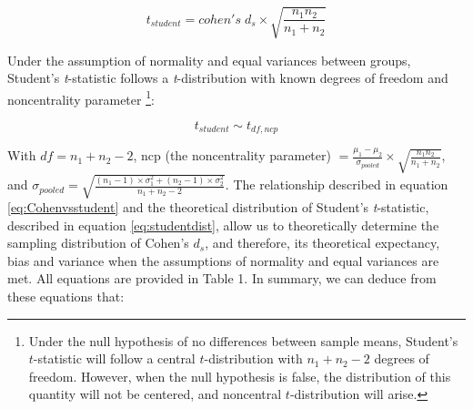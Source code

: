 \documentclass[
  man,floatsintext]{apa6}
\begin{document}
\begin{equation} 
t_{student} = cohen's \; d_s \times \sqrt{\frac{n_1n_2}{n_1+n_2}}
\label{eq:Cohenvsstudent}
\end{equation}

Under the assumption of normality and equal variances between groups, Student's \emph{t}-statistic follows a \emph{t}-distribution with known degrees of freedom and noncentrality parameter \footnote{Under the null hypothesis of no differences between sample means, Student's $t$-statistic will follow a central $t$-distribution with $n_1+n_2-2$ degrees of freedom. However, when the null hypothesis is false, the distribution of this quantity will not be centered, and noncentral $t$-distribution will arise.}:

\begin{equation} 
t_{student} \sim t_{df,ncp}
\label{eq:studentdist}
\end{equation}

With \(df=n_1+n_2-2\), ncp (the noncentrality parameter) \(= \frac{\mu_1-\mu_2}{\sigma_{pooled}} \times \sqrt{\frac{n_1n_2}{n_1+n_2}}\), and \(\sigma_{pooled}= \sqrt{\frac{(n_1-1) \times \sigma^2_1+(n_2-1) \times \sigma^2_2}{n_1+n_2-2}}\). The relationship described in equation \ref{eq:Cohenvsstudent} and the theoretical distribution of Student's \emph{t}-statistic, described in equation \ref{eq:studentdist}, allow us to theoretically determine the sampling distribution of Cohen's \(d_s\), and therefore, its theoretical expectancy, bias and variance when the assumptions of normality and equal variances are met. All equations are provided in Table 1. In summary, we can deduce from these equations that:
\end{document}
